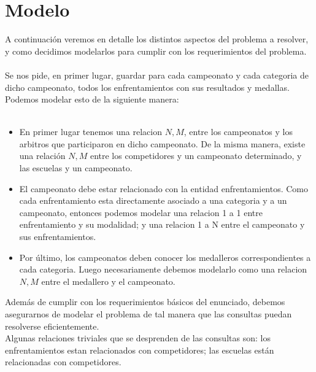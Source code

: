\section{Modelo}

A continuación veremos en detalle los distintos aspectos del problema a
 resolver, y como decidimos modelarlos para cumplir con los 
 requerimientos del problema. \\ \\
 
Se nos pide, en primer lugar, guardar para cada campeonato y cada 
categoria de dicho campeonato, todos los enfrentamientos con sus 
resultados y medallas. Podemos modelar esto de la siguiente manera:\\ \\

\begin{itemize}

\item En primer lugar tenemos una relacion $N,M$, entre los campeonatos y 
los arbitros que participaron en dicho campeonato. De la misma manera, 
existe una relación $N,M$ entre los competidores y un campeonato determinado, 
y las escuelas y un campeonato.\\

\item El campeonato debe estar relacionado con la entidad enfrentamientos.
Como cada enfrentamiento esta directamente asociado a una categoria y a 
un campeonato, entonces podemos modelar una relacion 1 a 1 entre enfrentamiento
y su modalidad; y una relacion 1 a N entre el campeonato y sus enfrentamientos.\\

\item Por último, los campeonatos deben conocer los medalleros correspondientes a 
cada categoria. Luego necesariamente debemos modelarlo como una relacion 
$N,M$ entre el medallero y el campeonato.\\

\end{itemize}

Además de cumplir con los requerimientos básicos del enunciado, debemos asegurarnos 
de modelar el problema de tal manera que las consultas puedan resolverse 
eficientemente. \\

Algunas relaciones triviales que se desprenden de las consultas son: 
los enfrentamientos estan relacionados con competidores; las escuelas están 
relacionadas con competidores. \\ \\

